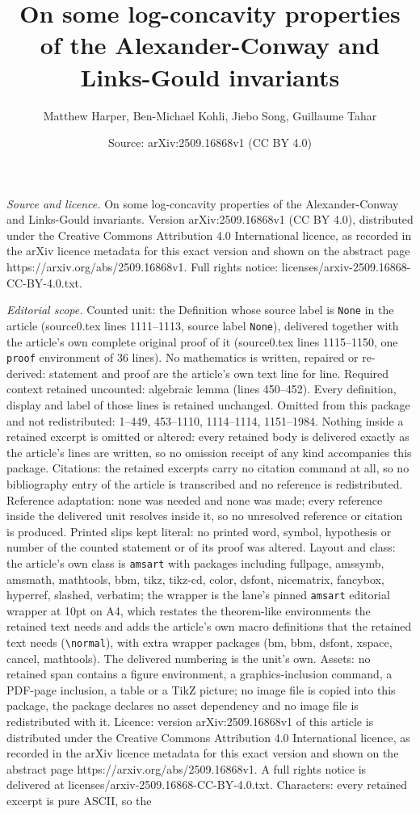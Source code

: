 \documentclass[10pt,a4paper]{amsart}
\title[On some log-concavity properties of the Alexander-Conway and]{On some log-concavity properties of the Alexander-Conway and Links-Gould invariants}
\author{Matthew Harper, Ben-Michael Kohli, Jiebo Song, Guillaume Tahar}
\date{Source: arXiv:2509.16868v1 (CC BY 4.0)}
\begin{document}
\maketitle

\noindent\emph{Source and licence.} On some log-concavity properties of the Alexander-Conway and Links-Gould invariants. Version arXiv:2509.16868v1 (CC BY 4.0), distributed under the Creative Commons Attribution 4.0 International licence, as recorded in the arXiv licence metadata for this exact version and shown on the abstract page https://arxiv.org/abs/2509.16868v1. Full rights notice: licenses/arxiv-2509.16868-CC-BY-4.0.txt.\par\smallskip

\noindent\textit{Editorial scope.} Counted unit: the Definition whose source label is \texttt{None} in the article (source0.tex lines 1111--1113, source label \texttt{None}), delivered together with the article's own complete original proof of it (source0.tex lines 1115--1150, one \texttt{proof} environment of 36 lines). No mathematics is written, repaired or re-derived: statement and proof are the article's own text line for line. Required context retained uncounted: algebraic lemma (lines 450--452). Every definition, display and label of those lines is retained unchanged. Omitted from this package and not redistributed: 1--449, 453--1110, 1114--1114, 1151--1984. Nothing inside a retained excerpt is omitted or altered: every retained body is delivered exactly as the article's lines are written, so no omission receipt of any kind accompanies this package. Citations: the retained excerpts carry no citation command at all, so no bibliography entry of the article is transcribed and no reference is redistributed. Reference adaptation: none was needed and none was made; every reference inside the delivered unit resolves inside it, so no unresolved reference or citation is produced. Printed slips kept literal: no printed word, symbol, hypothesis or number of the counted statement or of its proof was altered. Layout and class: the article's own class is \texttt{amsart} with packages including fullpage, amssymb, amsmath, mathtools, bbm, tikz, tikz-cd, color, dsfont, nicematrix, fancybox, hyperref, slashed, verbatim; the wrapper is the lane's pinned \texttt{amsart} editorial wrapper at 10pt on A4, which restates the theorem-like environments the retained text needs and adds the article's own macro definitions that the retained text needs (\texttt{\textbackslash normal}), with extra wrapper packages (bm, bbm, dsfont, xspace, cancel, mathtools). The delivered numbering is the unit's own. Assets: no retained span contains a figure environment, a graphics-inclusion command, a PDF-page inclusion, a table or a TikZ picture; no image file is copied into this package, the package declares no asset dependency and no image file is redistributed with it. Licence: version arXiv:2509.16868v1 of this article is distributed under the Creative Commons Attribution 4.0 International licence, as recorded in the arXiv licence metadata for this exact version and shown on the abstract page https://arxiv.org/abs/2509.16868v1. A full rights notice is delivered at licenses/arxiv-2509.16868-CC-BY-4.0.txt. Characters: every retained excerpt is pure ASCII, so the 
\end{document}
